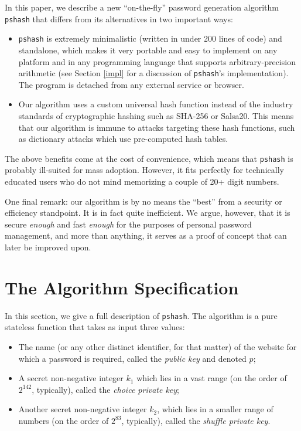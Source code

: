 \documentclass[a4paper, 10pt]{article}
\theoremstyle{plain}
\theoremstyle{definition}
\begin{document}
In this paper, we describe a new ``on-the-fly'' password generation algorithm \texttt{pshash} that differs from its alternatives in two important ways:

\begin{itemize}
  \item \texttt{pshash} is extremely minimalistic (written in under 200 lines of code) and standalone, which makes it very portable and easy to implement on any platform and in any programming language that supports arbitrary-precision arithmetic (see Section \ref{impl} for a discussion of \texttt{pshash}'s implementation). The program is detached from any external service or browser.

  \item Our algorithm uses a custom universal hash function instead of the industry standards of cryptographic hashing such as SHA-256 or Salsa20. This means that our algorithm is immune to attacks targeting these hash functions, such as dictionary attacks which use pre-computed hash tables.
\end{itemize}

The above benefits come at the cost of convenience, which means that \texttt{pshash} is probably ill-suited for mass adoption. However, it fits perfectly for technically educated users who do not mind memorizing a couple of 20+ digit numbers.

One final remark: our algorithm is by no means the ``best'' from a security or efficiency standpoint. It is in fact quite inefficient. We argue, however, that it is secure \emph{enough} and fast \emph{enough} for the purposes of personal password management, and more than anything, it serves as a proof of concept that can later be improved upon.

\section{The Algorithm Specification} \label{spec}

In this section, we give a full description of \texttt{pshash}. The algorithm is a pure stateless function that takes as input three values:

\begin{itemize}
  \item The name (or any other distinct identifier, for that matter) of the website for which a password is required, called the \emph{public key} and denoted $p$;
  \item A secret non-negative integer $k_1$ which lies in a vast range (on the order of $2^{142}$, typically), called the \emph{choice private key};
  \item Another secret non-negative integer $k_2$, which lies in a smaller range of numbers (on the order of $2^{83}$, typically), called the \emph{shuffle private key}.
\end{itemize}
\end{document}
